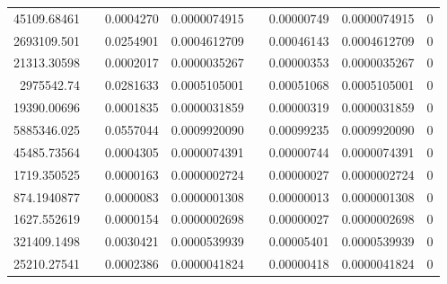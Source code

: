 \documentclass[
journal=jacsat, %
manuscript=article]{achemso}
\begin{document}
\begin{table}[htbp]
{\begin{tabular}{rrrrrrrr}
    45109.68461 &       & 0.0004270 & 0.0000074915 &       & 0.00000749 & 0.0000074915 & 0 \\
    2693109.501 &       & 0.0254901 & 0.0004612709 &       & 0.00046143 & 0.0004612709 & 0 \\
    21313.30598 &       & 0.0002017 & 0.0000035267 &       & 0.00000353 & 0.0000035267 & 0 \\
    2975542.74 &       & 0.0281633 & 0.0005105001 &       & 0.00051068 & 0.0005105001 & 0 \\
    19390.00696 &       & 0.0001835 & 0.0000031859 &       & 0.00000319 & 0.0000031859 & 0 \\
    5885346.025 &       & 0.0557044 & 0.0009920090 &       & 0.00099235 & 0.0009920090 & 0 \\
    45485.73564 &       & 0.0004305 & 0.0000074391 &       & 0.00000744 & 0.0000074391 & 0 \\
    1719.350525 &       & 0.0000163 & 0.0000002724 &       & 0.00000027 & 0.0000002724 & 0 \\
    874.1940877 &       & 0.0000083 & 0.0000001308 &       & 0.00000013 & 0.0000001308 & 0 \\
    1627.552619 &       & 0.0000154 & 0.0000002698 &       & 0.00000027 & 0.0000002698 & 0 \\
    321409.1498 &       & 0.0030421 & 0.0000539939 &       & 0.00005401 & 0.0000539939 & 0 \\
    25210.27541 &       & 0.0002386 & 0.0000041824 &       & 0.00000418 & 0.0000041824 & 0 \\
  \bottomrule
    \end{tabular}%
    }
  \label{tab:addlabel}%
\end{table}%
\end{document}
